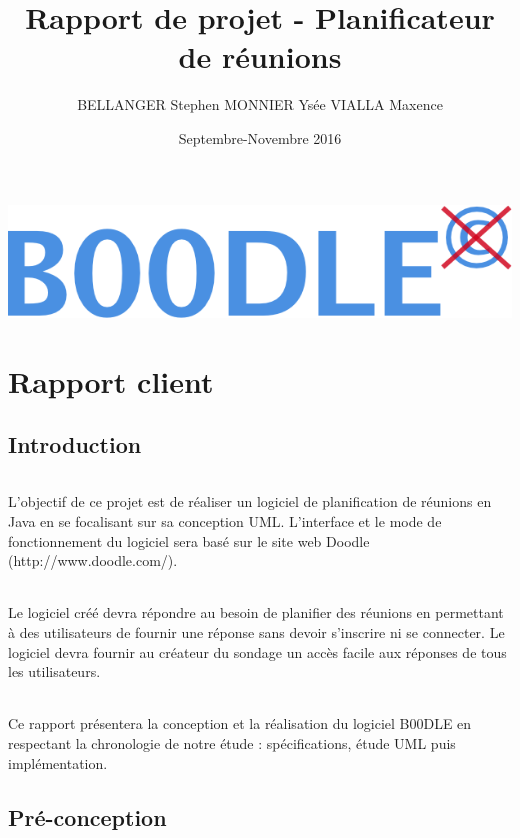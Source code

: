 \documentclass[]{report}
\title{Rapport de projet - Planificateur de réunions}
\author{BELLANGER Stephen
		MONNIER Ysée
		VIALLA Maxence}
\date{Septembre-Novembre 2016}
\begin{document}
\begin{titlepage}
	
	\includegraphics[scale=0.5]{figures/Logo_B00DLE.png}
	\maketitle
\end{titlepage}
\part{Rapport client}

\tableofcontents

\chapter{Introduction}

\paragraph{}
	L'objectif de ce projet est de réaliser un logiciel de planification de réunions en Java en se focalisant sur sa conception UML. L'interface et le mode de fonctionnement du logiciel sera basé sur le site web Doodle (http://www.doodle.com/). 
	\paragraph{}
	Le logiciel créé devra répondre au besoin de planifier des réunions en permettant à des utilisateurs de fournir une réponse sans devoir s'inscrire ni se connecter. Le logiciel devra fournir au créateur du sondage un accès facile aux réponses de tous les utilisateurs.
	\paragraph{}
	Ce rapport présentera la conception et la réalisation du logiciel B00DLE en respectant la chronologie de notre étude : spécifications, étude UML puis implémentation.



\chapter{Pré-conception}
\end{document}
